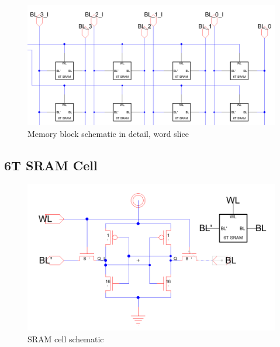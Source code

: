\documentclass[12pt]{report}
\begin{document}
\begin{figure}[H]
  \centering
    \includegraphics[width=1.0\textwidth]{Schematics/memory_block_word_schematic.PNG}
  \caption{Memory block schematic in detail, word slice}
  \label{fig:memory_block_word_schematic}
\end{figure}

\subsection*{6T SRAM Cell}
\begin{figure}[H]
  \centering
    \includegraphics[width=1.0\textwidth]{Schematics/sram_cell_schematic.PNG}
  \caption{SRAM cell schematic}
  \label{fig:sram_cell_schematic}
\end{figure}
\end{document}
